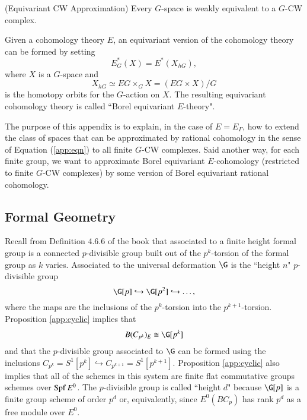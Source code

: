 \begin{theorem} (Equivariant CW Approximation)
Every $G$-space is weakly equivalent to a $G$-CW complex.
\end{theorem}

Given a cohomology theory $E$, an equivariant version of the cohomology theory can be formed by setting
\[
E^{*}_{G}(X) = E^*(X_{hG}),
\]
where $X$ is a $G$-space and
\[
X_{hG} \simeq EG \times_G X = (EG \times X)/G
\]
is the homotopy orbits for the $G$-action on $X$. The resulting equivariant cohomology theory is called ``Borel equivariant $E$-theory".

The purpose of this appendix is to explain, in the case of $E = E_{\Gamma}$, how to extend the class of spaces that can be approximated by rational cohomology in the sense of Equation (\ref{app:eqn}) to all finite $G$-CW complexes. Said another way, for each finite group, we want to approximate Borel equivariant $E$-cohomology (restricted to finite $G$-CW complexes) by some version of Borel equivariant rational cohomology.

\subsection*{Formal Geometry}


Recall from Definition 4.6.6 of the book that associated to a finite height formal group is a connected $p$-divisible group built out of the $p^k$-torsion of the formal group as $k$ varies. Associated to the universal deformation $\G$ is the ``height $n$" $p$-divisible group
\[
\G[p] \hookrightarrow \G[p^2] \hookrightarrow \ldots,
\]
where the maps are the inclusions of the $p^k$-torsion into the $p^{k+1}$-torsion. Proposition \ref{app:cyclic} implies that 
\[
B(C_{p^k})_{E} \cong \G[p^k]
\]
and that the $p$-divisible group associated to $\G$ can be formed using the inclusions $C_{p^k} = S^1[p^k] \hookrightarrow C_{p^{k+1}} = S^1[p^{k+1}]$. 
Proposition \ref{app:cyclic} also implies that all of the schemes in this system are finite flat commutative groups schemes over $\operatorname{Spf} E^0$. The $p$-divisible group is called ``height $d$" because $\G[p]$ is a finite group scheme of order $p^d$ or, equivalently, since $E^0(BC_p)$ has rank $p^d$ as a free module over $E^0$.

